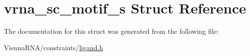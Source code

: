 \hypertarget{structvrna__sc__motif__s}{}\section{vrna\+\_\+sc\+\_\+motif\+\_\+s Struct Reference}
\label{structvrna__sc__motif__s}


The documentation for this struct was generated from the following file\+:\begin{DoxyCompactItemize}
\item 
Vienna\+R\+N\+A/constraints/\hyperlink{ligand_8h}{ligand.\+h}\end{DoxyCompactItemize}
